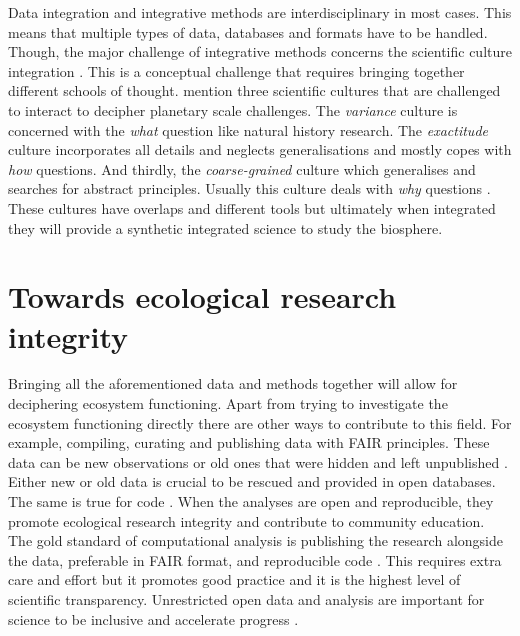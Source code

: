 Data integration and integrative methods are interdisciplinary in most cases. 
This means that multiple types of data, databases and formats have to be 
handled.
Though, the major challenge of integrative methods concerns the scientific culture 
integration \parencite{Enquist_2024}. 
This is a conceptual challenge that requires bringing together different schools 
of thought. 
\textcite{Enquist_2024} mention three scientific cultures that are challenged to
interact to decipher planetary scale challenges. The \textit{variance} culture 
is concerned with the \textit{what} question like natural history research. 
The \textit{exactitude} culture incorporates all details and neglects 
generalisations and mostly copes with \textit{how} questions. 
And thirdly, the \textit{coarse-grained} culture which generalises 
and searches for abstract principles. Usually this culture deals with 
\textit{why} questions \cite{Mayr_2004}. 
These cultures have overlaps and different tools but ultimately when 
integrated they will provide a synthetic integrated science to study 
the biosphere. 

\section{Towards ecological research integrity}
\label{sec:integrity}

Bringing all the aforementioned data and methods together will allow for deciphering ecosystem functioning.
Apart from trying to investigate the ecosystem functioning directly there are other 
ways to contribute to this field. 
For example, compiling, curating and publishing data with FAIR principles. 
These data can be new observations or old ones that were hidden and left unpublished \parencite{michener_nongeospatial_1997}. 
Either new or old data is crucial to be rescued and provided in open databases.
The same is true for code \parencite{barker2022introducing}. 
When the analyses are open and reproducible, they promote
ecological research integrity and contribute to community education. 
The gold standard of computational analysis is publishing 
the research alongside the data, preferable in FAIR format, and reproducible code \parencite{peng2011reproducible}.
This requires extra care and effort but it promotes good practice and it is 
the highest level of scientific transparency. 
Unrestricted open data and analysis are important for science to be inclusive and 
accelerate progress \parencite{Amann2019}.

